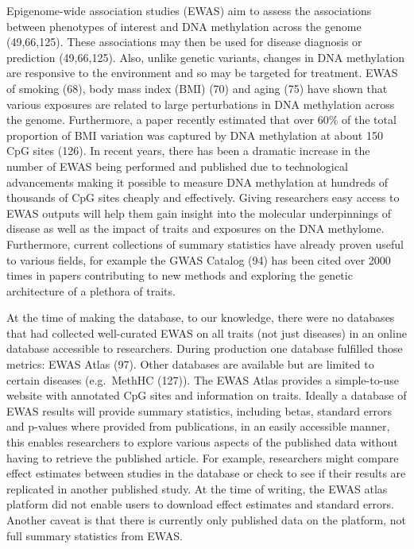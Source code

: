 \documentclass[11pt,oneside]{bristolthesis}
\begin{document}
Epigenome-wide association studies (EWAS) aim to assess the associations between phenotypes of interest and DNA methylation across the genome (49,66,125). These associations may then be used for disease diagnosis or prediction (49,66,125). Also, unlike genetic variants, changes in DNA methylation are responsive to the environment and so may be targeted for treatment. EWAS of smoking (68), body mass index (BMI) (70) and aging (75) have shown that various exposures are related to large perturbations in DNA methylation across the genome. Furthermore, a paper recently estimated that over 60\% of the total proportion of BMI variation was captured by DNA methylation at about 150 CpG sites (126). In recent years, there has been a dramatic increase in the number of EWAS being performed and published due to technological advancements making it possible to measure DNA methylation at hundreds of thousands of CpG sites cheaply and effectively. Giving researchers easy access to EWAS outputs will help them gain insight into the molecular underpinnings of disease as well as the impact of traits and exposures on the DNA methylome. Furthermore, current collections of summary statistics have already proven useful to various fields, for example the GWAS Catalog (94) has been cited over 2000 times in papers contributing to new methods and exploring the genetic architecture of a plethora of traits.

At the time of making the database, to our knowledge, there were no databases that had collected well-curated EWAS on all traits (not just diseases) in an online database accessible to researchers. During production one database fulfilled those metrics: EWAS Atlas (97). Other databases are available but are limited to certain diseases (e.g.~MethHC (127)). The EWAS Atlas provides a simple-to-use website with annotated CpG sites and information on traits. Ideally a database of EWAS results will provide summary statistics, including betas, standard errors and p-values where provided from publications, in an easily accessible manner, this enables researchers to explore various aspects of the published data without having to retrieve the published article. For example, researchers might compare effect estimates between studies in the database or check to see if their results are replicated in another published study. At the time of writing, the EWAS atlas platform did not enable users to download effect estimates and standard errors. Another caveat is that there is currently only published data on the platform, not full summary statistics from EWAS.
\end{document}
